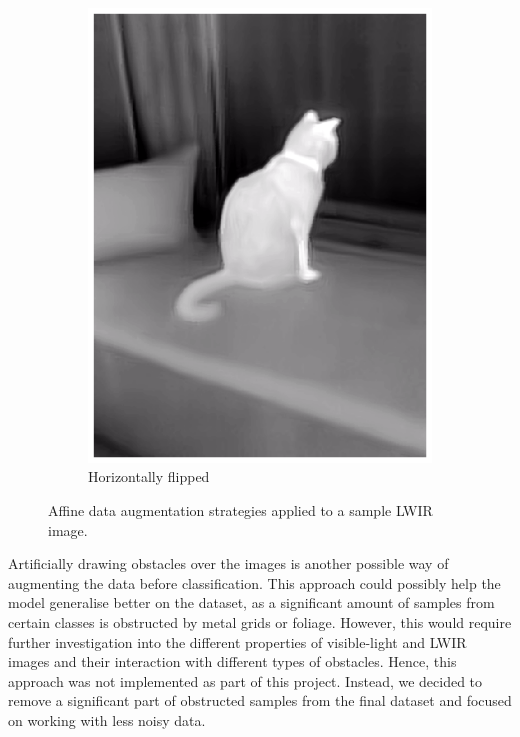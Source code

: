 \documentclass{l4proj}
\begin{document}
\begin{figure}[ht]
\begin{subfigure}[h!]{0.24\textwidth}
    \includegraphics[width=\textwidth]{images/augmentation/flipped.png}
    \caption{Horizontally flipped}
  \end{subfigure}
  \caption{Affine data augmentation strategies applied to a sample LWIR image.}
  \label{fig:augmentation_affine}
\end{figure}

Artificially drawing obstacles over the images is another possible way of augmenting the data before classification. This approach could possibly help the model generalise better on the dataset, as a significant amount of samples from certain classes is obstructed by metal grids or foliage. However, this would require further investigation into the different properties of visible-light and LWIR images and their interaction with different types of obstacles. Hence, this approach was not implemented as part of this project. Instead, we decided to remove a significant part of obstructed samples from the final dataset and focused on working with less noisy data. 
\end{document}
